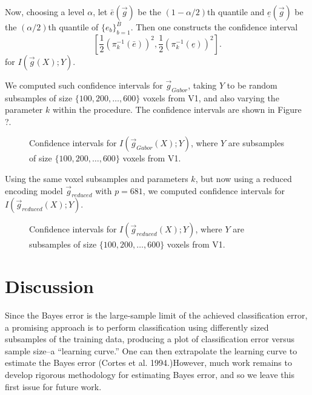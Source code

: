 \documentclass[12pt]{article}
\begin{document}
Now, choosing a level $\alpha$, let $\bar{e}(\vec{g})$ be the $(1-\alpha/2)$th
quantile and $\underline{e}(\vec{g})$ be the $(\alpha/2)$th quantile of
$\{e_b\}_{b=1}^B$.  Then one constructs the confidence interval
\[
[\frac{1}{2}(\pi_k^{-1}(\bar{e}))^2, \frac{1}{2}(\pi_k^{-1}(\underline{e}))^2].
\]
for $I(\vec{g}(X); Y)$.

We computed such confidence intervals for $\vec{g}_{Gabor}$, taking
$Y$ to be random subsamples of size $\{100, 200, \hdots, 600\}$ voxels
from V1, and also varying the parameter $k$ within the procedure.
The confidence intervals are shown in Figure ?.

\begin{figure}
\centering
\caption{Confidence intervals for $I(\vec{g}_{Gabor}(X); Y)$, where $Y$ are subsamples of size $\{100, 200, \hdots, 600\}$ voxels
from V1.}
\end{figure}

Using the same voxel subsamples and parameters $k$, but now using a
reduced encoding model $\vec{g}_{reduced}$ with $p=681$,
we computed confidence intervals for
$I(\vec{g}_{reduced}(X); Y)$.

\begin{figure}
\centering
\caption{Confidence intervals for $I(\vec{g}_{reduced}(X); Y)$, where $Y$ are subsamples of size $\{100, 200, \hdots, 600\}$ voxels
from V1.}
\end{figure}



\section{Discussion}

Since the Bayes error is the large-sample
limit of the achieved classification error, a promising approach is to
perform classification using differently sized subsamples of the
training data, producing a plot of classification error versus sample
size--a ``learning curve.'' One can then extrapolate the learning
curve to estimate the Bayes error (Cortes et al. 1994.)However, much
work remains to develop rigorous methodology for estimating Bayes
error, and so we leave this first issue for future work.
\end{document}
